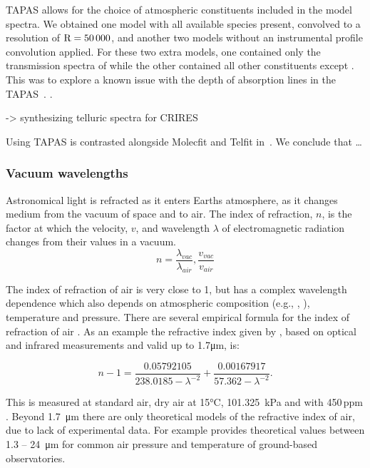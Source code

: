 {TAPAS} allows for the choice of atmospheric constituents included in the model spectra. We obtained one model with all available species present, convolved to a resolution of \(\rm R=50\,000\), and another two models without an instrumental profile convolution applied. For these two extra models, one contained only the transmission spectra of while the other contained all other constituents except . This was to explore a known issue with the depth of absorption lines in the TAPAS~\citet{bertaux_tapas_2014}. .


 -> synthesizing telluric spectra \nir{} for {CRIRES}~\cite{seifahrt_synthesising_2010}

Using {TAPAS} is contrasted alongside Molecfit and Telfit in~\cite{ulmer-moll_telluric_2018}. We conclude that \ldots



\subsubsection{Vacuum wavelengths}
Astronomical light is refracted as it enters Earths atmosphere, as it changes medium from the vacuum of space and to air. The index of refraction, \(n\), is the factor at which the velocity, \(v\), and wavelength \(\lambda\) of electromagnetic radiation changes from their values in a vacuum.
\begin{equation}
n  = \frac{\lambda_{vac}}{\lambda_{air}}, \frac{v_{vac}}{v_{air}}
\end{equation}

The index of refraction of air is very close to 1, but has a complex wavelength dependence which also depends on atmospheric composition (e.g., , ), temperature and pressure.
There are several empirical formula for the index of refraction of air \citep[e.g.,][]{edlen_dispersion_1953, peck_dispersion_1972, ciddor_refractive_1996}. As an example the refractive index given by \citet{ciddor_refractive_1996}, based on optical and infrared measurements and valid up to 1.7\si{\micro\meter}, is:

\begin{equation}
    n -1 = \frac{0.05792105}{238.0185 - \lambda^{-2}} + \frac{0.00167917}{57.362 - \lambda^{-2}}.
\end{equation}

This is measured at standard air, dry air at 15\si{\degreeCelsius}, 101.325\ \si{\kilo\pascal} and with 450\,ppm .
Beyond 1.7\ \si{\micro\meter} there are only theoretical models of the refractive index of air, due to lack of experimental data. For example \citet{mathar_refractive_2007} provides theoretical values between 1.3 -- 24\ \si{\micro\meter} for common air pressure and temperature of ground-based observatories.

